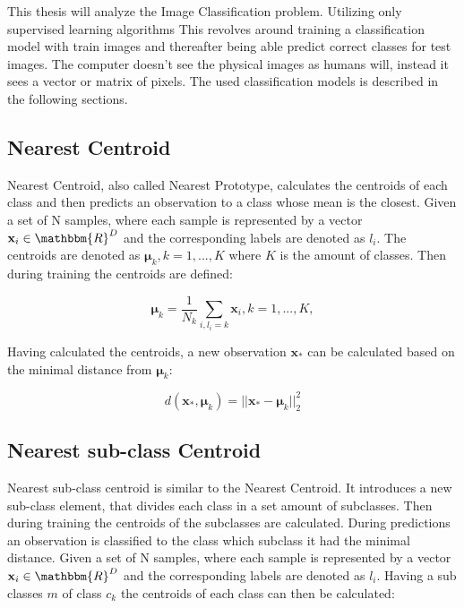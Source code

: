This thesis will analyze the Image Classification problem. Utilizing only supervised learning algorithms This revolves around training a classification model with train images and thereafter being able predict correct classes for test images. The computer doesn't see the physical images as humans will, instead it sees a vector or matrix of pixels. The used classification models is described in the following sections.     

\subsection{Nearest Centroid}
Nearest Centroid, also called Nearest Prototype, calculates the centroids of each class and then predicts an observation to a class whose mean is the closest. Given a set of N samples, where each sample is represented by a vector $\mathbf{x}_i\in\mathbbm{R}^D$ and the corresponding labels are denoted as $l_i$. The centroids are denoted as $\mathbf{\mu}_k, k=1,...,K$ where $K$ is the amount of classes. Then during training the centroids are defined\cite{ai-course-notes}: 

\begin{equation}
    \mathbf{\mu}_k = \frac{1}{N_k} \sum_{i,l_i=k}{\mathbf{x}_i}, k=1,...,K, 
\end{equation}

Having calculated the centroids, a new observation $\mathbf{x}_*$ can be calculated based on the minimal distance from $\mathbf{\mu}_k$: 

\begin{equation}
    d(\mathbf{x}_*, \mathbf{\mu}_k) = ||\mathbf{x}_*-\mathbf{\mu}_k||^2_2
\end{equation}

\subsection{Nearest sub-class Centroid}
Nearest sub-class centroid is similar to the Nearest Centroid. It introduces a new sub-class element, that divides each class in a set amount of subclasses. Then during training the centroids of the subclasses are calculated. During predictions an observation is classified to the class which subclass it had the minimal distance. Given a set of N samples, where each sample is represented by a vector $\mathbf{x}_i\in\mathbbm{R}^D$ and the corresponding labels are denoted as $l_i$. Having a sub classes $m$ of class $c_k$ the centroids of each class can then be calculated\cite{ai-course-notes}: 

